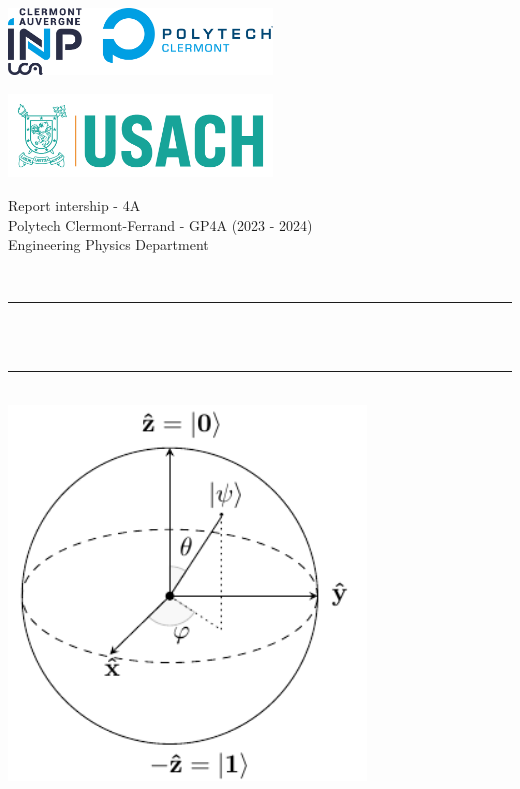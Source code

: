 
\begin{titlepage}

	\begin{minipage}{0.45\textwidth}
		\centering
		\includegraphics[width=7cm]{first_page/logo/logo_inp_polytech_2023.png}
	  \end{minipage}
	  \hfill
	  \begin{minipage}{0.45\textwidth}
		\centering
		\includegraphics[width=7cm]{first_page/logo/Usach S1.png}
	  \end{minipage}
	  

\begin{center}
	\Large{Report intership - 4A} \\
	\Large{Polytech Clermont-Ferrand - GP4A (2023 - 2024)}	\\
	Engineering Physics Department
\end{center}
\vspace*{-2cm}
	\newcommand{\HRule}{\rule{\linewidth}{0.5mm}}
	\centering 
	\quad\\[1.5cm]
	
	
	\makeatletter
	\HRule \\[0.35cm]
	{ \huge \bfseries \@title}\\[0.3cm] 
	\HRule \\[1cm]
	
	\includegraphics[width=9.5cm]{tikz/bloch_sphere/bloch_sphere.pdf}
	


\end{titlepage}
